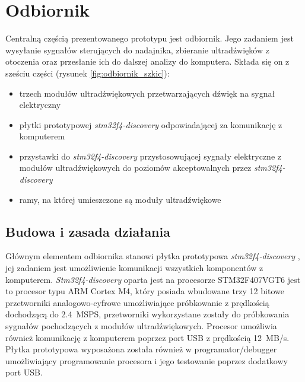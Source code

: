 \chapter{Odbiornik}

Centralną częścią prezentowanego prototypu jest odbiornik.
Jego zadaniem jest wysyłanie sygnałów sterujących do nadajnika, zbieranie ultradźwięków z otoczenia oraz przesłanie
ich do dalszej analizy do komputera.
Składa się on z sześciu części (rysunek \ref{fig:odbiornik_szkic}):

\begin{itemize}
 \item trzech modułów ultradźwiękowych przetwarzających dźwięk na sygnał elektryczny
 \item płytki prototypowej \textit{stm32f4-discovery} \cite{bib:stm32f4Discovery} odpowiadającej za komunikację z komputerem
 \item przystawki do \textit{stm32f4-discovery} przystosowującej sygnały elektryczne z modułów ultradźwiękowych
  do poziomów akceptowalnych przez \textit{stm32f4-discovery}
 \item ramy, na której umieszczone są moduły ultradźwiękowe
\end{itemize}




\section{Budowa i zasada działania}

Głównym elementem odbiornika stanowi płytka prototypowa \textit{stm32f4-discovery} \cite{bib:stm32f4Discovery},
jej zadaniem jest umożliwienie komunikacji wszystkich komponentów z komputerem.
\textit{Stm32f4-discovery} oparta jest na procesorze STM32F407VGT6 \cite{bib:stm32f407} jest to procesor typu ARM Cortex M4, 
który posiada wbudowane trzy 12 bitowe przetworniki
analogowo-cyfrowe umożliwiające próbkowanie z prędkością dochodzącą do \SI{2,4}{MSPS}, przetworniki wykorzystane zostały do próbkowania
sygnałów pochodzących z modułów ultradźwiękowych. Procesor umożliwia również komunikację z komputerem poprzez 
port USB z prędkością \SI{12}{MB/s}. Płytka prototypowa wyposażona została również w programator/debugger 
umożliwiający programowanie procesora i jego testowanie poprzez dodatkowy port USB.

